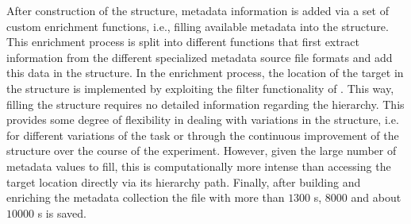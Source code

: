 After construction of the  structure, metadata information is added via a set of custom enrichment functions, i.e., filling available metadata into the structure. This enrichment process is split into different functions that first extract information from the different specialized metadata source file formats and add this data in the  structure. In the enrichment process, the location of the target  in the structure is implemented by exploiting the filter functionality of . This way, filling the  structure requires no detailed information regarding the  hierarchy. This provides some degree of flexibility in dealing with variations in the  structure, i.e. for different variations of the task or through the continuous improvement of the structure over the course of the experiment. However, given the large number of metadata values to fill, this is computationally more intense than accessing the target location directly via its hierarchy path. Finally, after building and enriching the metadata collection the  file with more than $1300$ s, $8000$  and about $10000$ s is saved.

